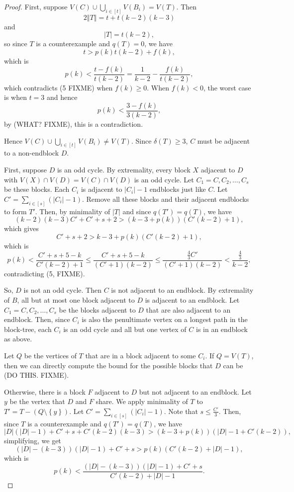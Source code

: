 \documentclass[12pt]{article}
\theoremstyle{plain}
\theoremstyle{definition}
\theoremstyle{remark}
\newcommand{\set}[1]{\left\{ #1 \right\}}
\newcommand{\card}[1]{\left|#1\right|}
\newcommand{\size}[1]{\left\Vert#1\right\Vert}
\newcommand{\irange}[1]{\left[#1\right]}
\newcommand{\parens}[1]{\left( #1 \right)}
\begin{document}
\begin{proof}
		 First, suppose $V(C) \cup \bigcup_{i \in \irange{t}} V(B_i) = V(T)$.  Then
		 \[2\size{T} = t + t(k-2)(k-3)\]
		 and
		 \[\card{T} = t(k-2),\]
		 so since $T$ is a counterexample and $q(T) = 0$, we have 
		 \[t > p(k)t(k-2) + f(k),\]
		 which is
		 \[p(k) < \frac{t - f(k)}{t(k-2)} = \frac{1}{k-2} - \frac{f(k)}{t(k-2)},\]
		 which contradicts (5 FIXME) when $f(k) \ge 0$.  When $f(k) < 0$, the worst case is when $t = 3$ and hence
		 \[p(k) < \frac{3 - f(k)}{3(k-2)},\]
		 by (WHAT? FIXME), this is a contradiction.
		 
		 Hence $V(C) \cup \bigcup_{i \in \irange{t}} V(B_i) \ne V(T)$.  Since $\delta(T) \ge 3$, $C$ must be adjacent to a non-endblock $D$.
		 
		 First, suppose $D$ is an odd cycle.  By extremality, every block $X$ adjacent to $D$ with $V(X) \cap V(D) = V(C) \cap V(D)$ is an odd cycle. Let $C_1 = C, C_2, \ldots, C_s$ be these blocks.  Each $C_i$ is adjacent to $|C_i| - 1$ endblocks just like $C$.   Let $C' = \sum_{i \in \irange{s}} \parens{\card{C_i} - 1}$. Remove all these blocks and their adjacent endblocks to form $T'$.  Then, by minimality of $\card{T}$ and since $q(T') = q(T)$, we have
		 \[(k-2)(k-3)C' + C' + s + 2 > (k-3 + p(k))(C'(k-2) + 1),\]
		 which gives
		 \[C' + s + 2 > k-3 + p(k)(C'(k-2) + 1),\]
		 which is
		 \[p(k) < \frac{C' + s + 5 - k}{C'(k-2) + 1} \le \frac{C' + s + 5 - k}{(C'+1)(k-2)} \le \frac{\frac43 C'}{(C'+1)(k-2)} < \frac{\frac43}{k-2},\]
		 contradicting (5, FIXME).		 
		 
		 So, $D$ is not an odd cycle.  Then $C$ is not adjacent to an endblock.  By extremality of $B$, all but at most one block adjacent to $D$ is adjacent to an endblock.  Let $C_1 = C, C_2, \ldots, C_s$ be the blocks adjacent to $D$ that are also adjacent to an endblock.  Then, since $C_i$ is also the penultimate vertex on a longest path in the block-tree, each $C_i$ is an odd cycle and all but one vertex of $C$ is in an endblock as above.
		 
		 Let $Q$ be the vertices of $T$ that are in a block adjacent to some $C_i$.  If $Q = V(T)$, then we can directly compute the bound for the possible blocks that $D$ can be (DO THIS.  FIXME).
		 
		 Otherwise, there is a block $F$ adjacent to $D$ but not adjacent to an endblock.  Let $y$ be the vertex that $D$ and $F$ share.  We apply minimality of $T$ to $T'= T - (Q \setminus \set{y})$.  Let $C' = \sum_{i \in \irange{s}} \parens{\card{C_i} - 1}$. Note that $s \le \frac{C'}{3}$. Then, since $T$ is a counterexample and $q(T') = q(T)$, we have
		 \[\card{D}(\card{D}-1) + C' + s + C'(k-2)(k-3) > (k-3 + p(k))(\card{D} - 1 + C'(k-2)),\]
		 simplifying, we get
		 \[(\card{D} - (k-3))(\card{D}-1) + C' + s > p(k)(C'(k-2) + \card{D} - 1),\]
		 which is
		 \[p(k) < \frac{(\card{D} - (k-3))(\card{D}-1) + C' + s}{C'(k-2) + \card{D} - 1}.\]
		 

\end{proof}
\end{document}
